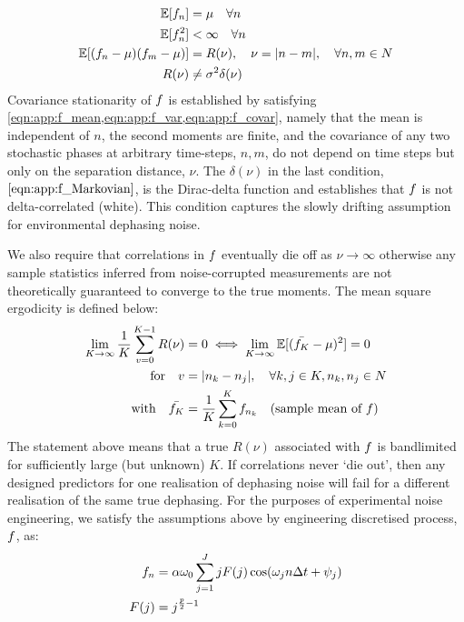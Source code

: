 \begin{align}
\mathbb{E}[f_n] &= \mu \quad \forall n \label{eqn:app:f_mean} \\
\mathbb{E}[f_n^2] & < \infty \quad \forall n \label{eqn:app:f_var} \\
\mathbb{E}[(f_n - \mu)(f_m - \mu)] &= R(\nu), \quad  \nu = |n-m|, \quad \forall n, m \in N  \label{eqn:app:f_covar} \\
R(\nu) & \neq \sigma^2  \delta(\nu) \label{eqn:app:f_Markovian} 
\end{align}
Covariance stationarity of $f$ is established by satisfying \cref{eqn:app:f_mean,eqn:app:f_var,eqn:app:f_covar}, namely that the mean is independent of $n$, the second moments are finite, and the covariance of any two stochastic phases at arbitrary time-steps, $n, m$, do not depend on time steps but only on the separation distance, $\nu$. The $\delta(\nu)$ in the last condition,  $ \cref{eqn:app:f_Markovian}$, is the Dirac-delta function and establishes that $f$ is not delta-correlated (white). This condition captures the slowly drifting assumption for environmental dephasing noise. 


We also require that correlations in $f$ eventually die off as $\nu \to \infty$ otherwise any sample statistics inferred from noise-corrupted measurements are not theoretically guaranteed to converge to the true moments. The mean square ergodicity is defined below:
\begin{align}
 \lim_{K \to \infty} \frac{1}{K} \sum_{v=0}^{K-1} R(\nu) & = 0  \iff  \lim_{K \to \infty} \mathbb{E}[(\bar{f_K} - \mu)^2] = 0 \nonumber \\
\text{for} \quad v &= |n_k - n_j|, \quad \forall k,j \in K, n_k, n_j \in N  \nonumber \\
\text{with} \quad \bar{f_K} &= \frac{1}{K} \sum_{k=0}^K f_{n_k} \quad \text{(sample mean of $f$)}  \label{eqn:app:f_msergodic}  
\end{align}
The statement above means that a true $R(\nu)$ associated with $f$ is bandlimited for sufficiently large (but unknown) $K$. If correlations never `die out', then any designed predictors for one realisation of dephasing noise will fail for a different realisation of the same true dephasing. For the purposes of experimental noise engineering, we satisfy the assumptions above by engineering discretised process, $f$, as:
\begin{align}
f_n &= \alpha \omega_0 \sum_{j=1}^{J} j F(j)\cos(\omega_j n \Delta t + \psi_j) \label{eqn:app:noiseengineering} \\
F(j) & = j^{\frac{p}{2}-1}  
\end{align}

